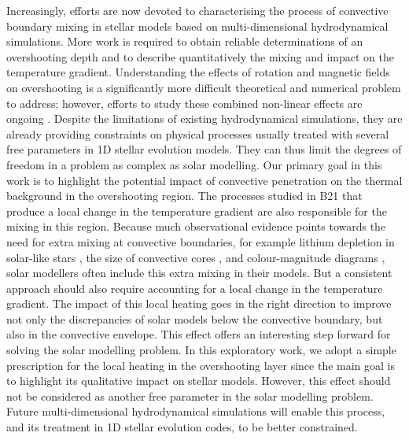 \documentclass[traditabstract]{aa}
\newcommand{\3}{\ss}
\newcommand{\cp}{\citep}
\begin{document}
{Increasingly, efforts are now devoted to characterising the process of convective boundary mixing in stellar models based on multi-dimensional hydrodynamical simulations. More work is required  to obtain reliable determinations of an overshooting depth and to describe quantitatively the mixing and impact on the temperature gradient.  Understanding the effects of rotation and magnetic fields on overshooting is a significantly more difficult theoretical and numerical problem to address; however, efforts to study these combined non-linear effects are ongoing \cp{hotta17, korre21}.
Despite the limitations of existing hydrodynamical simulations, they are already providing constraints on physical processes usually treated with several free parameters in 1D stellar evolution models. They can thus limit the degrees of freedom in a problem as complex as solar modelling. Our primary goal in this work is to highlight 
the potential impact of convective penetration on the thermal background in the overshooting region. The processes studied in B21 that produce  a local change in the temperature gradient are also responsible for the mixing in this region. Because much observational evidence points towards the need for extra mixing at convective boundaries, for example lithium depletion in solar-like stars \cp{baraffe17}, the size of convective cores \cp{claret16}, and colour-magnitude diagrams \cp{castro14}, solar modellers often include this extra mixing in their models. But a consistent approach should also require accounting for a local change in the temperature gradient. The impact of this local heating goes in the right direction to improve not only the discrepancies of solar models below the convective boundary, but also in the convective envelope. This effect offers an interesting step forward for solving the solar modelling problem. 
In this exploratory work, we adopt a simple prescription for the local heating in the overshooting layer since the main goal is to highlight its qualitative impact on stellar models. However, this effect should not be considered as another free parameter in the solar modelling problem. Future multi-dimensional hydrodynamical simulations will enable this process, and its treatment in 1D stellar evolution codes, to be better constrained. 
 

}
\end{document}

